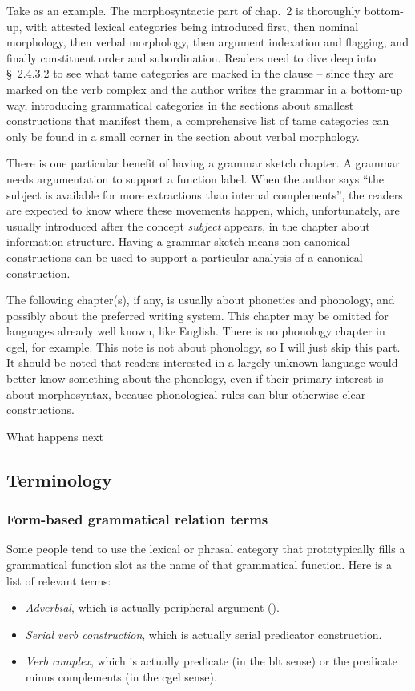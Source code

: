 \documentclass{article}
\newcommand*{\citesec}[1]{\S~{#1}}
\newcommand*{\citechap}[1]{chap.~{#1}}
\newcommand*{\term}[1]{\emph{#1}}
\begin{document}
Take \citet{jacques2021grammar} as an example.
The morphosyntactic part of \citechap{2} is thoroughly bottom-up,
with attested lexical categories being introduced first,
then nominal morphology,
then verbal morphology,
then argument indexation and flagging,
and finally constituent order and subordination.
Readers need to dive deep into \citesec{2.4.3.2} to see what \ac{tame} categories are marked in the clause
-- since they are marked on the verb complex 
and the author writes the grammar in a bottom-up way,
introducing grammatical categories in the sections about smallest constructions 
that manifest them,
a comprehensive list of \ac{tame} categories can only be found 
in a small corner in the section about verbal morphology.

There is one particular benefit of having a grammar sketch chapter.
A grammar needs argumentation to support a function label.
When the author says ``the subject is available for more extractions than internal complements'',
the readers are expected to know where these movements happen,
which, unfortunately,
are usually introduced after the concept \term{subject} appears,
in the chapter about information structure.
Having a grammar sketch means non-canonical constructions 
can be used to support a particular analysis of a canonical construction.

The following chapter(s), if any, is usually about phonetics and phonology,
and possibly about the preferred writing system.
This chapter may be omitted for languages already well known, like English.
There is no phonology chapter in \ac{cgel}, for example.
This note is not about phonology, so I will just skip this part.
It should be noted that readers interested in a largely unknown language 
would better know something about the phonology,
even if their primary interest is about morphosyntax,
because phonological rules can blur otherwise clear constructions.

What happens next 

\subsection{Terminology}

\subsubsection{Form-based grammatical relation terms}\label{sec:form-based-function-name}

Some people tend to use the lexical or phrasal category 
that prototypically fills a grammatical function slot 
as the name of that grammatical function.
Here is a list of relevant terms:
\begin{itemize}
    \item \term{Adverbial}, which is actually peripheral argument ().
    \item \term{Serial verb construction}, which is actually serial predicator construction.
    \item \term{Verb complex}, which is actually predicate (in the \ac{blt} sense) 
    or the predicate minus complements (in the \ac{cgel} sense).
\end{itemize}
\end{document}
